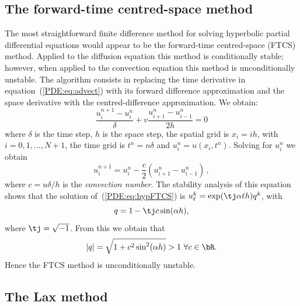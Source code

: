 \subsection{The forward-time centred-space method}

The most straightforward finite difference method for solving
hyperbolic partial differential equations would appear to be the
forward-time centred-space (FTCS) method.  Applied to the diffusion
equation this method is conditionally stable; however, when applied to
the convection equation this method is unconditionally unstable.  The
algorithm consists in replacing the time derivative in
equation~(\ref{PDE:eq:advect}) with its forward difference
approximation and the space derivative with the centred-difference
approximation.  We obtain:
%
\begin{equation*}
  \frac{u_{i}^{n+1}-u_{i}^{n}}{\delta} +
  v \frac{u_{i+1}^{n}-u_{i-1}^{n}}{2 h} = 0
\end{equation*}
%
where $\delta$ is the time step, $h$ is the space step, the spatial
grid is $x_i = i h$, with $i=0,1,\ldots,N+1$, the time grid is $t^n =
n \delta$ and $u_{i}^{n} = u(x_i,t^n)$.  Solving for $u_{i}^{n}$ we
obtain
%
\begin{equation}
  u_{i}^{n+1} = u_{i}^{n} - \frac{c}{2} (u_{i+1}^{n}-u_{i-1}^{n}) \, ,
  \label{PDE:eq:hypFTCS}
\end{equation}
%
where $c = u \delta/h$ is the \textit{convection number}.  The
stability analysis of this equation shows that the solution
of~(\ref{PDE:eq:hypFTCS}) is $u_{\ell}^{k} = \exp(\tj \alpha \ell h)
q^k$, with
%
\begin{equation*}
  q = 1 - \tj c \sin(\alpha h) ,
\end{equation*}
%
where $\tj = \sqrt{-1}$.  From this we obtain that
%
\begin{equation*}
  |q| = \sqrt{1 + c^2 \sin^2(\alpha h)} > 1 \, \, \forall c \in \bR .
\end{equation*}
%
Hence the FTCS method is unconditionally unstable.

\subsection{The Lax method}

